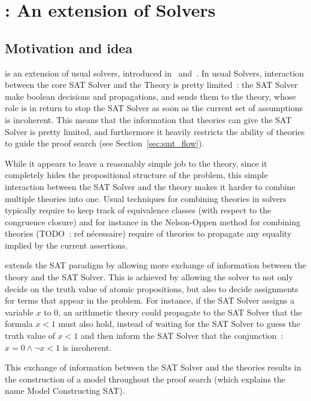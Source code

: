 \documentclass{article}
\begin{document}
\section{\mcsat{}: An extension of \smt{} Solvers}\label{sec:mcsat}

\subsection{Motivation and idea}

\mcsat{} is an extension of usual \smt{} solvers, introduced in~\cite{VMCAI13} and~\cite{FMCAD13}.
In usual \smt{} Solvers, interaction between the core SAT Solver and the Theory is pretty limited~:
the SAT Solver make boolean decisions and propagations, and sends them to the theory,
whose role is in return to stop the SAT Solver as soon as the current set of assumptions
is incoherent. This means that the information that theories can give the SAT Solver is
pretty limited, and furthermore it heavily restricts the ability of theories to guide
the proof search (see Section~\ref{sec:smt_flow}).

While it appears to leave a reasonably simple job to the theory, since it completely
hides the propositional structure of the problem, this simple interaction between the
SAT Solver and the theory makes it harder to combine multiple theories into one. Usual
techniques for combining theories in \smt{} solvers typically require to keep track of
equivalence classes (with respect to the congruence closure) and for instance
in the Nelson-Oppen method for combining theories (TODO~: ref nécessaire) require of
theories to propagate any equality implied by the current assertions.

\mcsat{} extends the SAT paradigm by allowing more exchange of information between the theory
and the SAT Solver. This is achieved by allowing the solver to not only decide on the truth value
of atomic propositions, but also to decide assignments for terms that appear in the problem.
For instance, if the SAT Solver assigns a variable $x$ to $0$,
an arithmetic theory could propagate to the SAT Solver that the formula $x < 1$ must also hold,
instead of waiting for the SAT Solver to guess the truth value of $x < 1$ and then
inform the SAT Solver that the conjunction~: $x = 0 \land \neg x < 1$ is incoherent.

This exchange of information between the SAT Solver and the theories results in
the construction of a model throughout the proof search (which explains the name
Model Constructing SAT).
\end{document}
